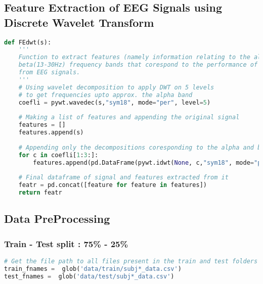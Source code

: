 \hypertarget{feature-extraction-of-eeg-signals-using-discrete-wavelet-transform}{%
\subsection{Feature Extraction of EEG Signals using Discrete Wavelet
Transform}\label{feature-extraction-of-eeg-signals-using-discrete-wavelet-transform}}

\begin{lstlisting}[language=Python]
def FEdwt(s):
    '''
    Function to extract features (namely information relating to the alpha(8-12Hz) and 
    beta(13-30Hz) frequency bands that corespond to the performance of motor functions.)
    from EEG signals.
    '''
    # Using wavelet decomposition to apply DWT on 5 levels 
    # to get frequencies upto approx. the alpha band 
    coefli = pywt.wavedec(s,"sym18", mode="per", level=5)
    
    # Making a list of features and appending the original signal
    features = []
    features.append(s)
    
    # Appending only the decompositions coresponding to the alpha and beta bands
    for c in coefli[1:3:]:
        features.append(pd.DataFrame(pywt.idwt(None, c,"sym18", mode="per")))
    
    # Final dataframe of signal and features extracted from it
    featr = pd.concat([feature for feature in features])
    return featr
\end{lstlisting}

\hypertarget{data-preprocessing}{%
\subsection{Data PreProcessing}\label{data-preprocessing}}

\hypertarget{train---test-split-75---25}{%
\subsubsection{Train - Test split : 75\% -
25\%}\label{train---test-split-75---25}}

\begin{lstlisting}[language=Python]
# Get the file path to all files present in the train and test folders
train_fnames =  glob('data/train/subj*_data.csv')
test_fnames =  glob('data/test/subj*_data.csv')
\end{lstlisting}

